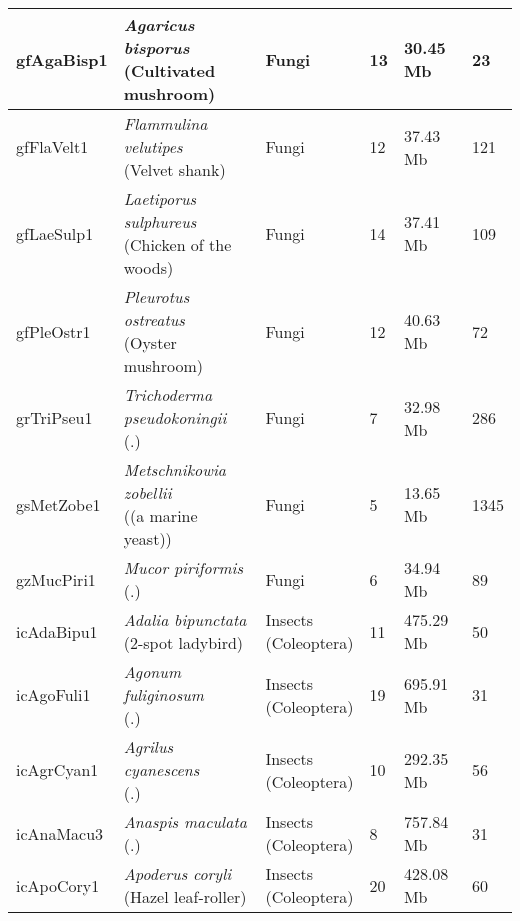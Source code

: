 \begin{centering}
\begin{longtable}{l|l|l|l|l|l}
gfAgaBisp1 & \makecell[{l}]{\textit{Agaricus bisporus} \\ (Cultivated mushroom)} & Fungi & 13 & 30.45 Mb & 23  \\ \hline
gfFlaVelt1 & \makecell[{l}]{\textit{Flammulina velutipes} \\ (Velvet shank)} & Fungi & 12 & 37.43 Mb & 121  \\ \hline
gfLaeSulp1 & \makecell[{l}]{\textit{Laetiporus sulphureus} \\ (Chicken of the woods)} & Fungi & 14 & 37.41 Mb & 109  \\ \hline
gfPleOstr1 & \makecell[{l}]{\textit{Pleurotus ostreatus} \\ (Oyster mushroom)} & Fungi & 12 & 40.63 Mb & 72  \\ \hline
grTriPseu1 & \makecell[{l}]{\textit{Trichoderma pseudokoningii} \\ (.)} & Fungi & 7 & 32.98 Mb & 286  \\ \hline
gsMetZobe1 & \makecell[{l}]{\textit{Metschnikowia zobellii} \\ ((a marine yeast))} & Fungi & 5 & 13.65 Mb & 1345  \\ \hline
gzMucPiri1 & \makecell[{l}]{\textit{Mucor piriformis} \\ (.)} & Fungi & 6 & 34.94 Mb & 89  \\ \hline
icAdaBipu1 & \makecell[{l}]{\textit{Adalia bipunctata} \\ (2-spot ladybird)} & \makecell[{l}]{Insects \\ (Coleoptera)} & 11 & 475.29 Mb & 50  \\ \hline
icAgoFuli1 & \makecell[{l}]{\textit{Agonum fuliginosum} \\ (.)} & \makecell[{l}]{Insects \\ (Coleoptera)} & 19 & 695.91 Mb & 31  \\ \hline
icAgrCyan1 & \makecell[{l}]{\textit{Agrilus cyanescens} \\ (.)} & \makecell[{l}]{Insects \\ (Coleoptera)} & 10 & 292.35 Mb & 56  \\ \hline
icAnaMacu3 & \makecell[{l}]{\textit{Anaspis maculata} \\ (.)} & \makecell[{l}]{Insects \\ (Coleoptera)} & 8 & 757.84 Mb & 31  \\ \hline
icApoCory1 & \makecell[{l}]{\textit{Apoderus coryli} \\ (Hazel leaf-roller)} & \makecell[{l}]{Insects \\ (Coleoptera)} & 20 & 428.08 Mb & 60  \\ \hline

\end{longtable}
\end{centering}

